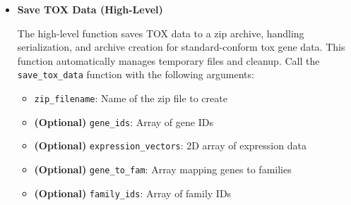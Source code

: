 \begin{enumerate}
\begin{itemize}
                  \begin{itemize}
                    \item \texttt{zip\_filename}: Path to the zip file to extract
                  \end{itemize}
                  
                  \textbf{Returns:}
                  \begin{itemize}
                    \item Dictionary mapping data keys to extracted temporary filenames
                  \end{itemize}
                  
                  \begin{lstlisting}[language=Python, caption={Python Extract Zip Archive}]
extract_zip_archive(zip_filename)
                  \end{lstlisting}
                  
            \item \textbf{Save TOX Data (High-Level)}
                  
                  The high-level function saves TOX data to a zip archive, handling
                  serialization, and archive creation for standard-conform tox gene data.
                  This function automatically manages temporary files and cleanup. Call the
                  \texttt{save\_tox\_data} function with the following arguments:
                  
                  \begin{itemize}
                    \item \texttt{zip\_filename}: Name of the zip file to create
                          
                    \item \textbf{(Optional)} \texttt{gene\_ids}: Array of gene IDs
                          
                    \item \textbf{(Optional)} \texttt{expression\_vectors}: 2D array of
                          expression data
                          
                    \item \textbf{(Optional)} \texttt{gene\_to\_fam}: Array mapping
                          genes to families
                          
                    \item \textbf{(Optional)} \texttt{family\_ids}: Array of family IDs
                          

\end{itemize}
\end{itemize}
\end{enumerate}
